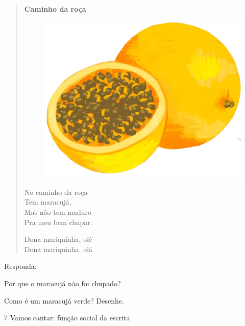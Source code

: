 \begin{myquote}
\begin{verse}
\textbf{Caminho da roça}
\begin{figure}[H]
\centering
\includegraphics[width=.35\textwidth]{media/image197.png}
\end{figure}
\vspace{-2em}
No caminho da roça\\
Tem maracujá,\\
Mas não tem maduro\\
Pra meu bem chupar.

Dona mariquinha, olê\\
Dona mariquinha, olá
\end{verse}

\end{myquote}

Responda:

\begin{escolha}
\item Por que o maracujá não foi chupado?


\item Como é um maracujá verde? Desenhe.

\begin{mdframed}[linewidth=2pt,linecolor=salmao,roundcorner=10pt]
\vspace{4cm}
\end{mdframed}
\end{escolha}

\num{7} Vamos cantar: função social da escrita


